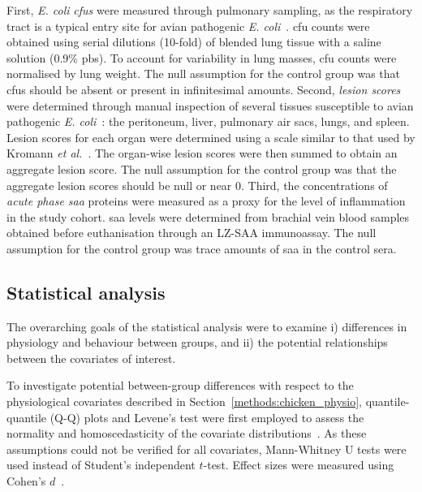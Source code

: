 First, \textit{E. coli} \emph{\glspl{cfu}} were measured through pulmonary sampling, as the respiratory tract is a typical entry site for avian pathogenic \textit{E. coli}~\cite{dho1999}. \Gls{cfu} counts were obtained using serial dilutions (10-fold) of blended lung tissue with a saline solution (0.9\% \gls{pbs}). To account for variability in lung masses, \gls{cfu} counts were normalised by lung weight. The null assumption for the control group was that \glspl{cfu} should be absent or present in infinitesimal amounts. Second, \emph{lesion scores} were determined through manual inspection of several tissues susceptible to avian pathogenic \textit{E. coli}~\cite{dho1999, nolan2013, kromann2021, liu2025}: the peritoneum, liver, pulmonary air sacs, lungs, and spleen. Lesion scores for each organ were determined using a scale similar to that used by Kromann \textit{et al.}~\cite{kromann2021}. The organ-wise lesion scores were then summed to obtain an aggregate lesion score. The null assumption for the control group was that the aggregate lesion scores should be null or near 0. Third, the concentrations of \emph{acute phase \gls{saa}} proteins were measured as a proxy for the level of inflammation~\cite{sack2020} in the study cohort. \Gls{saa} levels were determined from brachial vein blood samples obtained before euthanisation through an LZ-SAA immunoassay. The null assumption for the control group was trace amounts of \gls{saa} in the control sera.


\subsection{Statistical analysis}
\label{methods:chicken_stats}

The overarching goals of the statistical analysis were to examine i) differences in physiology and behaviour between groups, and ii) the potential relationships between the covariates of interest.

To investigate potential between-group differences with respect to the physiological covariates described in Section~\ref{methods:chicken_physio}, quantile-quantile (Q-Q) plots and Levene's test were first employed to assess the normality and homoscedasticity of the covariate distributions~\cite{fein2022}. As these assumptions could not be verified for all covariates, Mann-Whitney U tests were used instead of Student's independent $t$-test. Effect sizes were measured using Cohen's $d$~\cite{fein2022}. 

